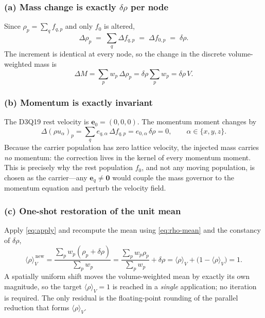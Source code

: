 \documentclass[11pt]{article}
\theoremstyle{definition}
\theoremstyle{remark}
\begin{document}
\subsubsection{(a) Mass change is exactly \texorpdfstring{$\delta\rho$}{drho} per node}
Since $\rho_p=\sum_q f_{q,p}$ and only $f_0$ is altered,
\begin{equation}
\Delta\rho_p \;=\; \sum_q \Delta f_{q,p}
\;=\; \Delta f_{0,p} \;=\; \delta\rho .
\label{eq:mass-change}
\end{equation}
The increment is identical at every node, so the change in the discrete
volume-weighted mass is
\begin{equation}
\Delta M
=\sum_p w_p\,\Delta\rho_p
=\delta\rho\sum_p w_p
=\delta\rho\,V .
\label{eq:DeltaM}
\end{equation}

\subsubsection{(b) Momentum is exactly invariant}
The D3Q19 rest velocity is $\mathbf{e}_0=(0,0,0)$. The momentum moment changes by
\begin{equation}
\Delta(\rho u_\alpha)_p
=\sum_q e_{q,\alpha}\,\Delta f_{q,p}
=e_{0,\alpha}\,\delta\rho
=0,
\qquad \alpha\in\{x,y,z\}.
\label{eq:momentum-invariant}
\end{equation}
Because the carrier population has zero lattice velocity, the injected mass
carries \emph{no} momentum: the correction lives in the kernel of every momentum
moment. This is precisely why the rest population $f_0$, and not any moving
population, is chosen as the carrier---any $\mathbf{e}_q\ne\mathbf 0$ would couple
the mass governor to the momentum equation and perturb the velocity field.

\subsubsection{(c) One-shot restoration of the unit mean}
Apply \eqref{eq:apply} and recompute the mean using \eqref{eq:rho-mean} and the
constancy of $\delta\rho$,
\begin{equation}
\langle\rho\rangle_V^{\,\mathrm{new}}
=\frac{\sum_p w_p(\rho_p+\delta\rho)}{\sum_p w_p}
=\frac{\sum_p w_p\rho_p}{\sum_p w_p}+\delta\rho
=\langle\rho\rangle_V+\bigl(1-\langle\rho\rangle_V\bigr)
=1 .
\label{eq:one-shot}
\end{equation}
A spatially uniform shift moves the volume-weighted mean by exactly its own
magnitude, so the target $\langle\rho\rangle_V=1$ is reached in a \emph{single}
application; no iteration is required. The only residual is the floating-point
rounding of the parallel reduction that forms $\langle\rho\rangle_V$.
\end{document}
